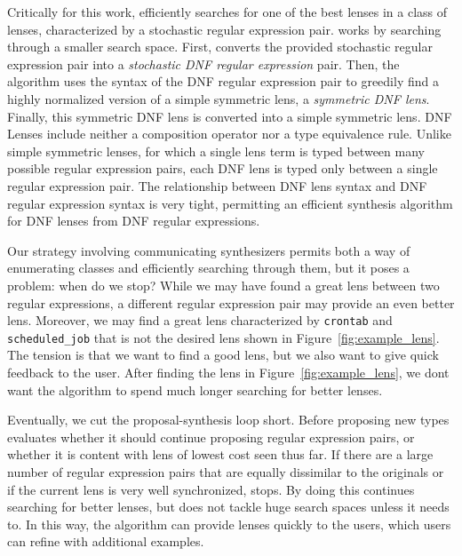 \documentclass[acmsmall,screen,anonymous]{acmart}
\begin{document}
Critically for this work, \GreedySynth efficiently searches for one of the best
lenses in a class of lenses, characterized by a stochastic regular expression
pair. \GreedySynth works by searching through a smaller search space. First,
\GreedySynth converts the provided stochastic regular expression pair into a
\emph{stochastic DNF regular expression} pair. Then, the algorithm uses the
syntax of the DNF regular expression pair to greedily find a highly normalized
version of a simple symmetric lens, a \emph{symmetric DNF lens}. Finally, this
symmetric DNF lens is converted into a simple symmetric lens. DNF Lenses include
neither a composition operator nor a type equivalence rule. Unlike simple
symmetric lenses, for which a single lens term is typed between many possible
regular expression pairs, each DNF lens is typed only between a single regular
expression pair. The relationship between DNF lens syntax and DNF regular
expression syntax is very tight, permitting an efficient
synthesis algorithm for DNF lenses from DNF regular expressions.

Our strategy involving communicating synthesizers permits both a way of
enumerating classes and efficiently searching through them, but it poses a
problem: when do we stop? While we may have found a great lens between two regular
expressions, a different regular expression pair may provide an even better
lens. Moreover, we may find a great lens characterized by
\lstinline{crontab} and \lstinline{scheduled_job} that is not the
desired lens shown in Figure~\ref{fig:example_lens}.  The
tension is that we want to find a good lens, but we also want to give quick feedback to
the user. After finding the lens in Figure~\ref{fig:example_lens}, we dont want
the algorithm to spend much longer searching for better lenses.

 Eventually, we cut the proposal-synthesis
loop short. Before proposing new types \RXSearch evaluates whether it should
continue proposing regular expression pairs, or whether it is content with lens
of lowest cost seen thus far. If there are a large number of regular expression
pairs that are equally dissimilar to the originals or if the current lens is
very well synchronized, \RXSearch stops. By doing this \RXSearch continues
searching for better lenses, but does not tackle huge search spaces unless it
needs to. In this way, the algorithm can provide lenses quickly to the users,
which users can refine with additional examples.

\end{document}
